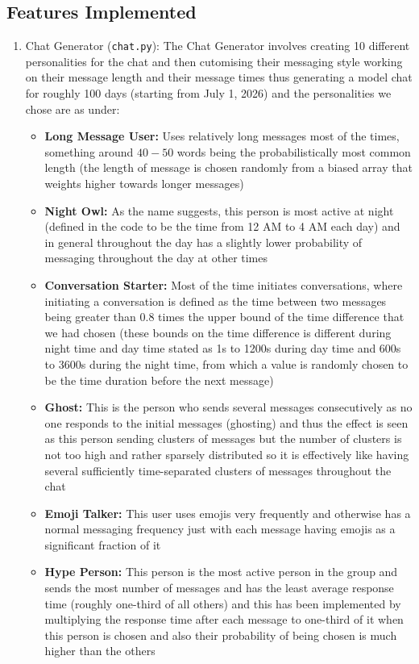 \documentclass[12pt]{extarticle}
\begin{document}
\subsection{Features Implemented}
\begin{enumerate}
    \item Chat Generator (\texttt{chat.py}): The Chat Generator involves creating 10 different personalities for the chat and then cutomising their messaging style working on their message length and their message times thus generating a model chat for roughly 100 days (starting from July 1, 2026) and the personalities we chose are as under:
    \begin{itemize}
        \item \textbf{Long Message User: } Uses relatively long messages most of the times, something around $40-50$ words being the probabilistically most common length (the length of message is chosen randomly from a biased array that weights higher towards longer messages)
        \item \textbf{Night Owl: } As the name suggests, this person is most active at night (defined in the code to be the time from 12 AM to 4 AM each day) and in general throughout the day has a slightly lower probability of messaging throughout the day at other times
        \item \textbf{Conversation Starter: } Most of the time initiates conversations, where initiating a conversation is defined as the time between two messages being greater than 0.8 times the upper bound of the time difference that we had chosen (these bounds on the time difference is different during night time and day time stated as 1s to 1200s during day time and 600s to 3600s during the night time, from which a value is randomly chosen to be the time duration before the next message)
        \item \textbf{Ghost: } This is the person who sends several messages consecutively as no one responds to the initial messages (ghosting) and thus the effect is seen as this person sending clusters of messages but the number of clusters is not too high and rather sparsely distributed so it is effectively like having several sufficiently time-separated clusters of messages throughout the chat
        \item \textbf{Emoji Talker: } This user uses emojis very frequently and otherwise has a normal messaging frequency just with each message having emojis as a significant fraction of it
        \item \textbf{Hype Person: } This person is the most active person in the group and sends the most number of messages and has the least average response time (roughly one-third of all others) and this has been implemented by multiplying the response time after each message to one-third of it when this person is chosen and also their probability of being chosen is much higher than the others

\end{itemize}
\end{enumerate}
\end{document}
